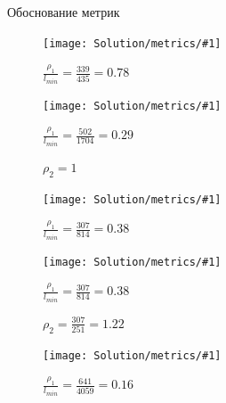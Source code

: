 \documentclass[russian, hyperref={unicode}]{beamer}
\begin{document}
\newcommand{\metricspicture}[1] {
    \texttt{[image: Solution/metrics/\#1]}
}

\begin{frame}[noframenumbering, t]{Обоснование метрик}
     {
        \begin{figure}
            \metricspicture{1-dissimilar}

            $\frac{\rho_1}{l_{min}} = \frac{339}{435} = 0.78$
        \end{figure}
    }
     {
        \begin{figure}
            \metricspicture{1-uncertain-2-similar}

            $\frac{\rho_1}{l_{min}} = \frac{502}{1704} = 0.29$

            $\rho_2 = 1$
        \end{figure}
    }
     {
        \begin{figure}
            \metricspicture{1-uncertain-2-dissimilar-gclosest}

            $\frac{\rho_1}{l_{min}} = \frac{307}{814} = 0.38$
        \end{figure}
    }
     {
        \begin{figure}
            \metricspicture{1-uncertain-2-dissimilar-closest}

            $\frac{\rho_1}{l_{min}} = \frac{307}{814} = 0.38$

            $\rho_2 = \frac{307}{251} = 1.22$
        \end{figure}
    }
     {
        \begin{figure}
            \metricspicture{1-similar}

            $\frac{\rho_1}{l_{min}} = \frac{641}{4059} = 0.16$
        \end{figure}
    }
\end{frame}

\newcommand{\potentialsupdatepicture}[1] {
    \texttt{[image: Solution/potentials-update/\#1]}
}
\end{document}
